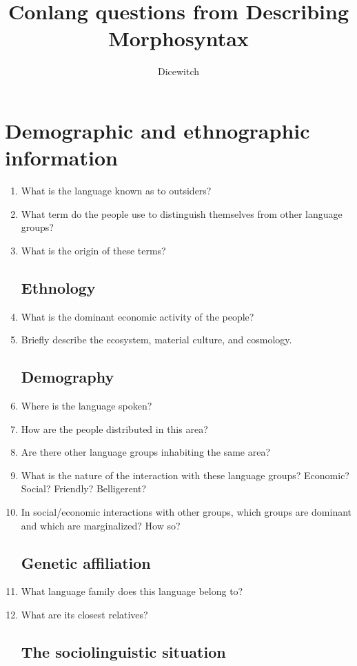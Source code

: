 \documentclass[twocolumn]{scrartcl}
\title{Conlang questions from Describing Morphosyntax}
\author{Dicewitch}
\begin{document}
\maketitle
\tableofcontents
\pagebreak
\twocolumn
\section{Demographic and ethnographic information}
\begin{enumerate}
\subsection{Name of the language}
\item What is the language known as to outsiders?
\item What term do the people use to distinguish themselves from other language groups?
\item What is the origin of these terms?
\subsection{Ethnology}
\item What is the dominant economic activity of the people?
\item Briefly describe the ecosystem, material culture, and cosmology.
\subsection{Demography}
\item Where is the language spoken?
\item How are the people distributed in this area?
\item Are there other language groups inhabiting the same area?
\item What is the nature of the interaction with these language groups? Economic? Social? Friendly? Belligerent?

\item In social/economic interactions with other groups, which groups are dominant and which are marginalized?  How so?
\subsection{Genetic affiliation}
\item What language family does this language belong to?
\item What are its closest relatives?
\subsection{The sociolinguistic situation}

\end{enumerate}
\end{document}
